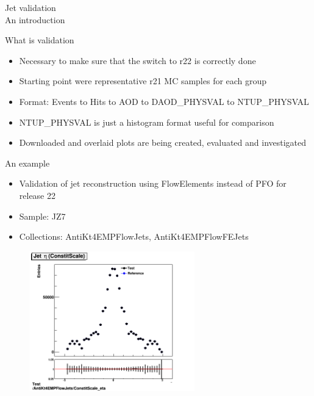 \begin{frame}
    \centering \Huge Jet validation \\ An introduction
\end{frame}

\begin{frame}{What is validation}
    \begin{itemize}
        \item Necessary to make sure that the switch to r22 is correctly done
        \item Starting point were representative r21 MC samples for each group
        \item Format: Events to Hits to AOD to DAOD\_PHYSVAL to NTUP\_PHYSVAL
        \item NTUP\_PHYSVAL is just a histogram format useful for comparison
        \item Downloaded and overlaid plots are being created, evaluated and investigated
    \end{itemize}
\end{frame}

\begin{frame}{An example}
    \begin{itemize}
        \item Validation of jet reconstruction using FlowElements instead of PFO for release 22
        \item Sample: JZ7 
        \item Collections: AntiKt4EMPFlowJets, AntiKt4EMPFlowFEJets
    \end{itemize}
    \begin{figure}
        \centering
        \includegraphics[width=0.64\textwidth]{goodAgreement.png}
    \end{figure}    
\end{frame}

